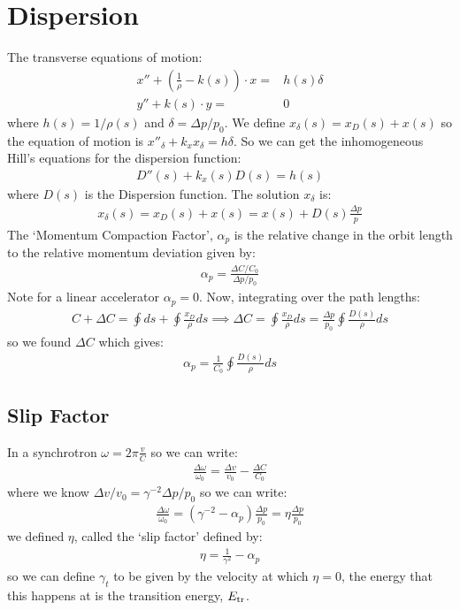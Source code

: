 \documentclass{article}
\numberwithin{equation}{section}
\begin{document}
\section{Dispersion}
The transverse equations of motion:
\begin{align}
x'' + \left( \frac{1}{\rho}- k(s) \right)\cdot x =& h(s) \delta \\
y'' + k(s) \cdot y =& 0
\end{align}
where $h(s) = 1/\rho(s)$ and $\delta= \Delta p / p_0$. We define $x_\delta(s) = x_D(s) + x(s)$ so the equation of motion is $x''_\delta + k_x x_\delta = h \delta$. So we can get the inhomogeneous Hill's equations for the dispersion function:
\begin{align}
D''(s) + k_x(s)D(s) = h(s)
\end{align}
where $D(s)$ is the Dispersion function. The solution $x_\delta$ is:
\begin{align}
x_\delta(s) = x_D(s) + x(s) = x(s) + D(s)\frac{\Delta p}{p}
\end{align}
The `Momentum Compaction Factor', $\alpha_p$ is the relative change in the orbit length to the relative momentum deviation given by:
\begin{align}
\alpha_p = \frac{\Delta C/C_0}{\Delta p / p_0}
\end{align}
Note for a linear accelerator $\alpha_p = 0$. Now, integrating over the path lengths:
\begin{align}
C+\Delta C = \oint ds + \oint \frac{x_D}{\rho}ds \implies \Delta C = \oint \frac{x_D}{\rho}ds = \frac{\Delta p}{p_0}\oint \frac{D(s)}{\rho}ds
\end{align}
so we found $\Delta C$ which gives:
\begin{align}
\alpha_p = \frac{1}{C_0} \oint \frac{D(s)}{\rho}ds
\end{align}

\subsection{ Slip Factor }

In a synchrotron $\omega = 2 \pi \frac{v}{C}$ so we can write:
\begin{align}
\frac{\Delta \omega}{\omega_0} = \frac{\Delta v}{v_0} - \frac{\Delta C}{C_0}
\end{align}
where we know $\Delta v/v_0 = \gamma^{-2} \Delta p / p_0$ so we can write:
\begin{align}
\frac{\Delta \omega}{\omega_0} = \left( \gamma^{-2} - \alpha_p \right)  \frac{\Delta p}{p_0} = \eta \frac{\Delta p}{p_0}
\end{align}
we defined $\eta$, called the `slip factor' defined by:
\begin{align}
\eta = \frac{1}{\gamma^2} - \alpha_p 
\end{align}
so we can define $\gamma_t$ to be given by the velocity at which $\eta=0$, the energy that this happens at is the transition energy, $E_{\rm tr}$. 
\end{document}
